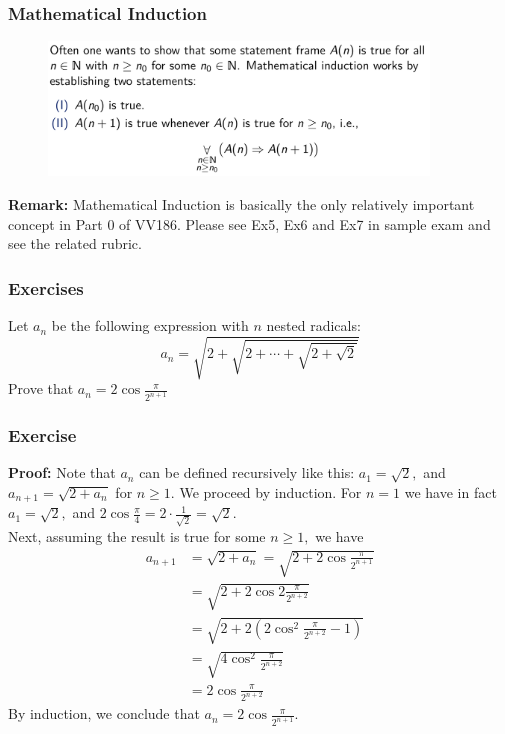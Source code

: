 \documentclass[10pt, t]{beamer}
\newcommand{\nullspace}{~\\[15pt]}
\begin{document}
\begin{frame}
    \frametitle{Mathematical Induction}

    \begin{figure}[H]
        \centering
        \includegraphics[width=0.9\textwidth]{2020-09-23-12-37-23.png}
    \end{figure}

    \textbf{Remark:} Mathematical Induction is basically the only relatively important concept in Part 0 of VV186. Please see Ex5, Ex6 and Ex7 in sample exam and see the related rubric.

\end{frame}

\begin{frame}
    \frametitle{Exercises}
    Let $a_{n}$ be the following expression with $n$ nested radicals:
    $$
        a_{n}=\sqrt{2+\sqrt{2+\cdots+\sqrt{2+\sqrt{2}}}}
    $$
    Prove that $a_{n}=2 \cos \frac{\pi}{2^{n+1}}$


\end{frame}

\begin{frame}
    \frametitle{Exercise}
    \textbf{Proof: }Note that $a_{n}$ can be defined recursively like this: $a_{1}=\sqrt{2},$ and $a_{n+1}=\sqrt{2+a_{n}}$ for $n \geq 1 .$ We proceed by induction. For $n=1$ we have in fact $a_{1}=\sqrt{2},$ and $2 \cos \frac{\pi}{4}=2 \cdot \frac{1}{\sqrt{2}}=\sqrt{2}$.\nullspace
    Next, assuming the result is true for some $n \geq 1,$ we have
    $$
        \begin{aligned}
            a_{n+1} & =\sqrt{2+a_{n}}=\sqrt{2+2 \cos \frac{\pi}{2^{n+1}}}       \\
                    & =\sqrt{2+2 \cos 2 \frac{\pi}{2^{n+2}}}                    \\
                    & =\sqrt{2+2\left(2 \cos ^{2} \frac{\pi}{2^{n+2}}-1\right)} \\
                    & =\sqrt{4 \cos ^{2} \frac{\pi}{2^{n+2}}}                   \\
                    & =2 \cos \frac{\pi}{2^{n+2}}
        \end{aligned}
    $$
    By induction, we conclude that $a_{n}=2 \cos \frac{\pi}{2^{n+1}}$.
\end{frame}
\end{document}
